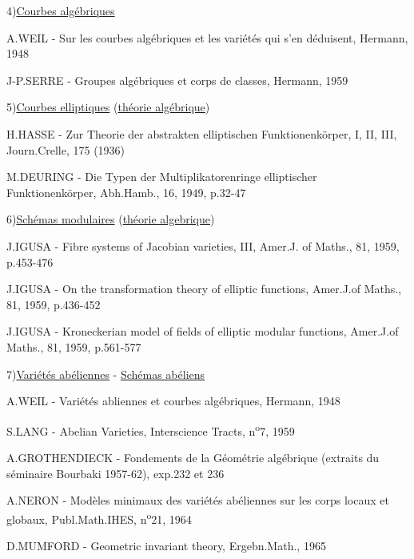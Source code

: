 \clearpage
{}
\reversemarginpar
{}
\normalmarginpar
{}

4)\quad \uline{Courbes algébriques}

\reversemarginpar
{}
A.WEIL - Sur \makebox[0pt][l]{\deleted{\unsure{-|=}}}les courbes algébriques et les variétés qui s'en déduisent, Hermann, 1948

J-P.SERRE - Groupes algébriques et corps de classes, Hermann, 1959

5)\quad \uline{Courbes elliptiques} (\uline{théorie algébrique})

H.HASSE - Zur Theorie der abstrakten elliptischen Funktionenkörper, I, II, III, Journ.Crelle, 175 (1936)

M.DEURING - Die Typen der Multiplikatorenringe elliptischer Funktionenkörper, Abh.Hamb., 16, 1949, p.32-47

6)\quad \uline{Schémas modulaires} (\uline{théorie algebrique})

J.IGUSA - Fibre systems of Jacobian varieties, III, Amer.J. of Maths., 81, 1959, p.453-476

J.IGUSA - On the transformation theory of elliptic functions, Amer.J.of Maths., 81, 1959, p.436-452

J.IGUSA - Kroneckerian model of fields of elliptic modular functions, Amer.J.of Maths., 81, 1959, p.561-577

7)\quad \uline{Variétés abéliennes} - \uline{Schémas abéliens}

A.WEIL - Variétés abliennes et courbes algébriques, Hermann, 1948

S.LANG - Abelian Varieties, Interscience Tracts, n\textsuperscript{o}7, 1959

A.GROTHENDIECK - Fondements de la Géométrie algébrique (extraits du séminaire Bourbaki 1957-62), exp.232 et 236

A.NERON - Modèles minimaux des variétés abéliennes sur les corps locaux et globaux, Publ.Math.IHES, n\textsuperscript{o}21, 1964

D.MUMFORD - Geometric invariant theory, Ergebn.Math., 1965
\normalmarginpar
